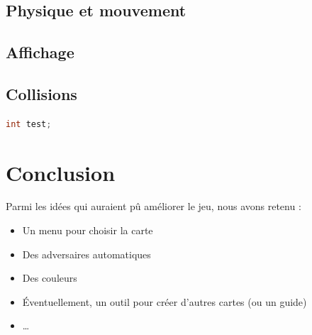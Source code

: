 \documentclass[12pt]{article}
\begin{document}
	\subsection{Physique et mouvement}
	
	\subsection{Affichage}
	
	\subsection{Collisions}
	
	
	\begin{lstlisting}[language=C, title={Programme en C}]
		int test;
	\end{lstlisting}

\section{Conclusion}

Parmi les idées qui auraient pû améliorer le jeu, nous avons retenu :
\begin{itemize}
	\item Un menu pour choisir la carte
	\item Des adversaires automatiques
	\item Des couleurs
	\item Éventuellement, un outil pour créer d'autres cartes (ou un guide)
	\item \dots
\end{itemize}
	
\end{document}
